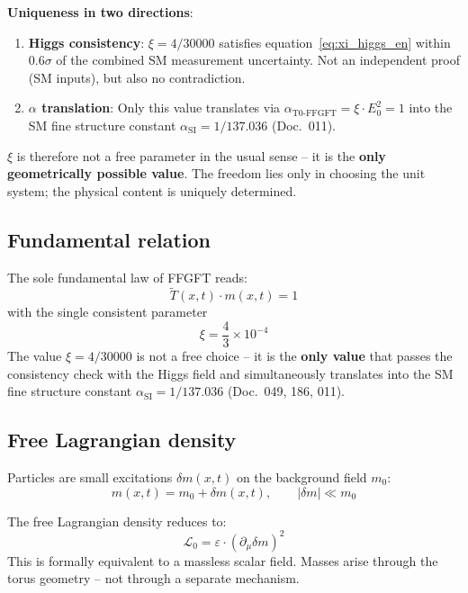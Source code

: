 \textbf{Uniqueness in two directions}:
\begin{enumerate}
    \item \textbf{Higgs consistency}: $\xi = 4/30000$ satisfies
          equation~\eqref{eq:xi_higgs_en} within $0.6\sigma$ of the
          combined SM measurement uncertainty. Not an independent proof
          (SM inputs), but also no contradiction.
    \item \textbf{$\alpha$ translation}: Only this value translates
          via $\alpha_{\text{T0-FFGFT}} = \xi \cdot E_0^2 = 1$ into the
          SM fine structure constant
          $\alpha_{\text{SI}} = 1/137.036$ (Doc.~011).
\end{enumerate}

$\xi$ is therefore not a free parameter in the usual sense -- it is
the \textbf{only geometrically possible value}. The freedom lies
only in choosing the unit system; the physical content is uniquely
determined.

\subsection{Fundamental relation}

The sole fundamental law of FFGFT reads:
\begin{equation}
    \tilde{T}(x,t) \cdot m(x,t) = 1
    \label{eq:fundamental}
\end{equation}
with the single consistent parameter
\begin{equation}
    \xi = \frac{4}{3} \times 10^{-4}
\end{equation}
The value $\xi = 4/30000$ is not a free choice -- it is the
\textbf{only value} that passes the consistency check with the
Higgs field and simultaneously translates into the SM fine
structure constant $\alpha_{\text{SI}} = 1/137.036$
(Doc.~049, 186, 011).

\subsection{Free Lagrangian density}

Particles are small excitations $\delta m(x,t)$ on the background field $m_0$:
\begin{equation}
    m(x,t) = m_0 + \delta m(x,t), \qquad |\delta m| \ll m_0
\end{equation}

The free Lagrangian density reduces to:
\begin{equation}
    \mathcal{L}_0 = \varepsilon \cdot (\partial_\mu \delta m)^2
    \label{eq:L0}
\end{equation}
This is formally equivalent to a massless scalar field. Masses
arise through the torus geometry -- not through a separate mechanism.


